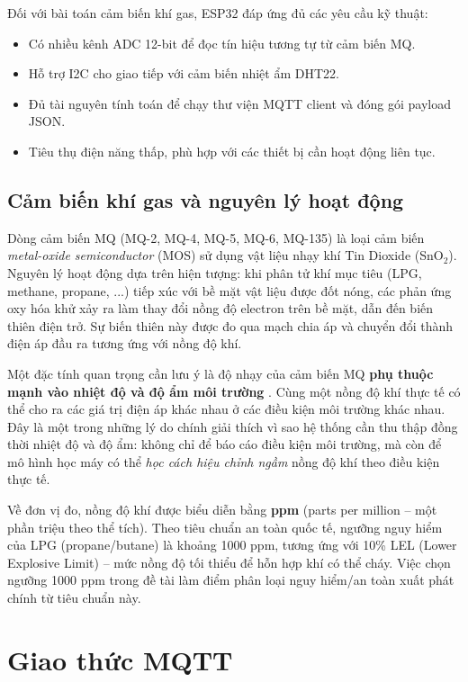 Đối với bài toán cảm biến khí gas, ESP32 đáp ứng đủ các yêu cầu kỹ thuật:
\begin{itemize}
  \item Có nhiều kênh ADC 12-bit để đọc tín hiệu tương tự từ cảm biến MQ.
  \item Hỗ trợ I2C cho giao tiếp với cảm biến nhiệt ẩm DHT22.
  \item Đủ tài nguyên tính toán để chạy thư viện MQTT client và đóng gói payload JSON.
  \item Tiêu thụ điện năng thấp, phù hợp với các thiết bị cần hoạt động liên tục.
\end{itemize}

\subsection{Cảm biến khí gas và nguyên lý hoạt động}

Dòng cảm biến MQ (MQ-2, MQ-4, MQ-5, MQ-6, MQ-135) là loại cảm biến \textit{metal-oxide semiconductor} (MOS) sử dụng vật liệu nhạy khí Tin Dioxide (SnO$_2$). Nguyên lý hoạt động dựa trên hiện tượng: khi phân tử khí mục tiêu (LPG, methane, propane, ...) tiếp xúc với bề mặt vật liệu được đốt nóng, các phản ứng oxy hóa khử xảy ra làm thay đổi nồng độ electron trên bề mặt, dẫn đến biến thiên điện trở. Sự biến thiên này được đo qua mạch chia áp và chuyển đổi thành điện áp đầu ra tương ứng với nồng độ khí.

Một đặc tính quan trọng cần lưu ý là độ nhạy của cảm biến MQ \textbf{phụ thuộc mạnh vào nhiệt độ và độ ẩm môi trường} \cite{tian2019}. Cùng một nồng độ khí thực tế có thể cho ra các giá trị điện áp khác nhau ở các điều kiện môi trường khác nhau. Đây là một trong những lý do chính giải thích vì sao hệ thống cần thu thập đồng thời nhiệt độ và độ ẩm: không chỉ để báo cáo điều kiện môi trường, mà còn để mô hình học máy có thể \textit{học cách hiệu chỉnh ngầm} nồng độ khí theo điều kiện thực tế.

Về đơn vị đo, nồng độ khí được biểu diễn bằng \textbf{ppm} (parts per million – một phần triệu theo thể tích). Theo tiêu chuẩn an toàn quốc tế, ngưỡng nguy hiểm của LPG (propane/butane) là khoảng 1000 ppm, tương ứng với 10\% LEL (Lower Explosive Limit) – mức nồng độ tối thiểu để hỗn hợp khí có thể cháy. Việc chọn ngưỡng 1000 ppm trong đề tài làm điểm phân loại nguy hiểm/an toàn xuất phát chính từ tiêu chuẩn này.

\section{Giao thức MQTT}

